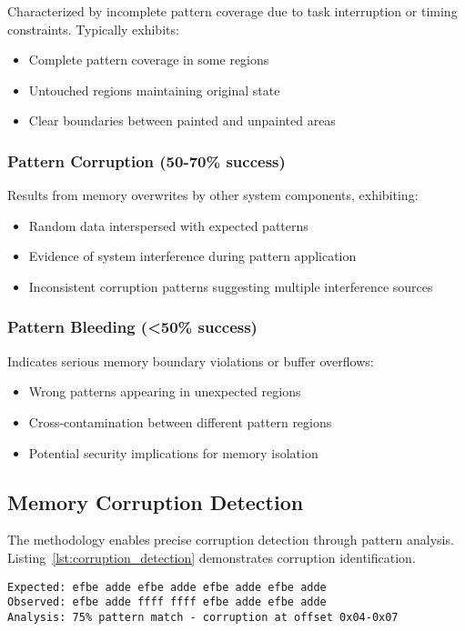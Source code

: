 \documentclass[11pt,a4paper]{article}
\begin{document}
Characterized by incomplete pattern coverage due to task interruption or timing constraints. Typically exhibits:
\begin{itemize}
    \item Complete pattern coverage in some regions
    \item Untouched regions maintaining original state
    \item Clear boundaries between painted and unpainted areas
\end{itemize}

\subsubsection{Pattern Corruption (50-70\% success)}

Results from memory overwrites by other system components, exhibiting:
\begin{itemize}
    \item Random data interspersed with expected patterns
    \item Evidence of system interference during pattern application
    \item Inconsistent corruption patterns suggesting multiple interference sources
\end{itemize}

\subsubsection{Pattern Bleeding (<50\% success)}

Indicates serious memory boundary violations or buffer overflows:
\begin{itemize}
    \item Wrong patterns appearing in unexpected regions
    \item Cross-contamination between different pattern regions
    \item Potential security implications for memory isolation
\end{itemize}

\subsection{Memory Corruption Detection}

The methodology enables precise corruption detection through pattern analysis. Listing~\ref{lst:corruption_detection} demonstrates corruption identification.

\begin{lstlisting}[style=hexdump, caption=Memory Corruption Detection Example, label=lst:corruption_detection]
Expected: efbe adde efbe adde efbe adde efbe adde
Observed: efbe adde ffff ffff efbe adde efbe adde
Analysis: 75% pattern match - corruption at offset 0x04-0x07
\end{lstlisting}
\end{document}
